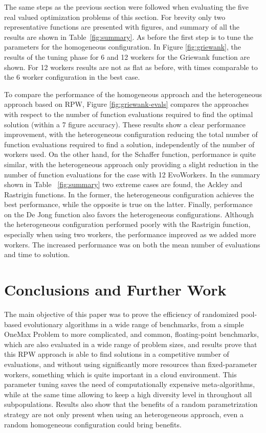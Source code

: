 \documentclass[conference]{IEEEtran}
\begin{document}
The same steps as the previous section were followed when evaluating the five real valued
optimization problems of this section.  For brevity only two representative functions are
presented with figures, and summary of all the results are shown in Table~\ref{fig:summary}. As before
the first step is to tune the parameters for the homogeneous configuration.
In Figure \ref{fig:griewank}, the results of the tuning phase for 6 and 12 workers
for the Griewank function are shown. For 12 workers results are not as flat as before,
with times comparable to the 6 worker configuration in the best case.

To compare the performance of the homogeneous approach and the heterogeneous approach based on RPW,
Figure \ref{fig:griewank-evals} compares the approaches with respect to the number of function evaluations required to find the optimal solution (within a 7 figure accuracy).
These results show a clear performance improvement, with the heterogeneous configuration
reducing the total number of function evaluations required to find a solution,
independently of the number of workers used.
On the other hand, for the Schaffer function, performance is quite similar,
with the heterogeneous approach only providing a slight reduction in the number
of function evaluations for the case with 12 EvoWorkers.
In the summary shown in Table ~\ref{fig:summary} two extreme cases are found, the Ackley and Rastrigin functions.
In the former, the heterogeneous configuration achieves the best performance, while the opposite is true on the latter.
Finally, performance on the De Jong function also favors the heterogeneous configurations.
Although the heterogeneous configuration performed poorly with the Rastrigin
function, especially when using two workers, the performance improved as we
added more workers.  The increased performance was on both the mean number of
evaluations and time to solution.
\section{Conclusions and Further Work}
\label{sec:conclusions}

The main objective of this paper was to prove the efficiency of
randomized pool-based evolutionary algorithms in a wide range of
benchmarks, from a simple OneMax Problem to more complicated, and
common, floating-point benchmarks, which are also evaluated in a wide
range of problem sizes, and results prove that this RPW approach is
able to find solutions in a competitive number of evaluations, and
without using significantly more resources than fixed-parameter
workers, something which is quite important in a cloud
environment. This parameter tuning saves the need of computationally
expensive meta-algorithms, while at the same time allowing to keep a
high diversity level in throughout all subpopulations.
Results also show that the benefits of a random parametrization
strategy are not only present when using an heterogeneous approach, 
even a random homogeneous configuration could bring benefits.
\end{document}

